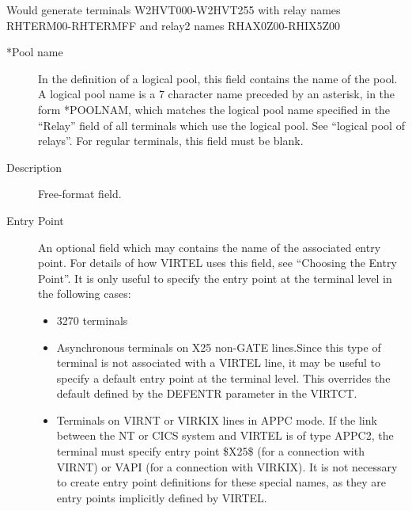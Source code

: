 \documentclass[letterpaper,10pt,english]{sphinxmanual}
\begin{document}
\begin{sphinxVerbatim}[commandchars=\\\{\}]
     
        
       
      
\end{sphinxVerbatim}

Would generate terminals W2HVT000-W2HVT255 with relay names RHTERM00-RHTERMFF and relay2 names RHAX0Z00-RHIX5Z00
\begin{description}
\item[{*Pool name}] \leavevmode
In the definition of a logical pool, this field contains the name of the pool. A logical pool name is a 7 character name preceded by an asterisk, in the form *POOLNAM, which matches the logical pool name specified in the “Relay” field of all terminals which use the logical pool. See “logical pool of relays”. For regular terminals, this field must be blank.

\item[{Description}] \leavevmode
Free-format field.

\item[{Entry Point}] \leavevmode
An optional field which may contains the name of the associated entry point. For details of how VIRTEL uses this field, see “Choosing the Entry Point”. It is only useful to specify the entry point at the terminal level in the following cases:
\begin{itemize}
\item {} 
3270 terminals

\item {} 
Asynchronous terminals on X25 non-GATE lines.Since this type of terminal is not associated with a VIRTEL line, it may be useful to specify a default entry point at the terminal level. This overrides the default defined by the DEFENTR parameter in the VIRTCT.

\item {} 
Terminals on VIRNT or VIRKIX lines in APPC mode. If the link between the NT or CICS system and VIRTEL is of type APPC2, the terminal must specify entry point \$X25\$ (for a connection with VIRNT) or VAPI (for a connection with VIRKIX). It is not necessary to create entry point definitions for these special names, as they are entry points implicitly defined by VIRTEL.


\end{itemize}
\end{description}
\end{document}
